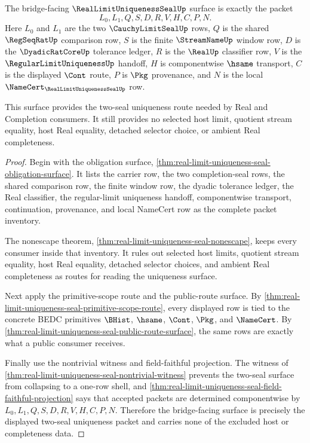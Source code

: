 \begin{theorem}
\label{thm:real-limit-uniqueness-bridged-seal-surface}
The bridge-facing $\RealLimitUniquenessSealUp$ surface is exactly the packet
$$
L_0,L_1,Q,S,D,R,V,H,C,P,N .
$$
Here $L_0$ and $L_1$ are the two $\CauchyLimitSealUp$ rows, $Q$ is the shared $\RegSeqRatUp$ comparison row, $S$ is the finite $\StreamNameUp$ window row, $D$ is the $\DyadicRatCoreUp$ tolerance ledger, $R$ is the $\RealUp$ classifier row, $V$ is the $\RegularLimitUniquenessUp$ handoff, $H$ is componentwise $\hsame$ transport, $C$ is the displayed $\Cont$ route, $P$ is $\Pkg$ provenance, and $N$ is the local $\NameCert_{\RealLimitUniquenessSealUp}$ row.

This surface provides the two-seal uniqueness route needed by Real and Completion consumers. It still provides no selected host limit, quotient stream equality, host Real equality, detached selector choice, or ambient Real completeness.
\end{theorem}
\begin{proof}
Begin with the obligation surface, \autoref{thm:real-limit-uniqueness-seal-obligation-surface}. It lists the carrier row, the two completion-seal rows, the shared comparison row, the finite window row, the dyadic tolerance ledger, the Real classifier, the regular-limit uniqueness handoff, componentwise transport, continuation, provenance, and local NameCert row as the complete packet inventory.

The nonescape theorem, \autoref{thm:real-limit-uniqueness-seal-nonescape}, keeps every consumer inside that inventory. It rules out selected host limits, quotient stream equality, host Real equality, detached selector choices, and ambient Real completeness as routes for reading the uniqueness surface.

Next apply the primitive-scope route and the public-route surface. By \autoref{thm:real-limit-uniqueness-seal-primitive-scope-route}, every displayed row is tied to the concrete BEDC primitives $\BHist$, $\hsame$, $\Cont$, $\Pkg$, and $\NameCert$. By \autoref{thm:real-limit-uniqueness-seal-public-route-surface}, the same rows are exactly what a public consumer receives.

Finally use the nontrivial witness and field-faithful projection. The witness of \autoref{thm:real-limit-uniqueness-seal-nontrivial-witness} prevents the two-seal surface from collapsing to a one-row shell, and \autoref{thm:real-limit-uniqueness-seal-field-faithful-projection} says that accepted packets are determined componentwise by $L_0,L_1,Q,S,D,R,V,H,C,P,N$. Therefore the bridge-facing surface is precisely the displayed two-seal uniqueness packet and carries none of the excluded host or completeness data.
\end{proof}

